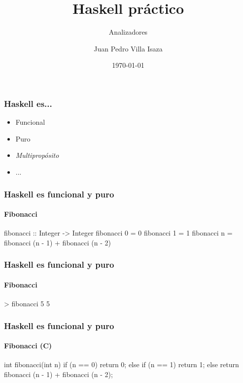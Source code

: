 \documentclass[spanish]{beamer}
\title{Haskell práctico}
\subtitle{Analizadores}
\author{Juan Pedro Villa Isaza}
\institute{Stack Builders}
\date{\today}
\begin{document}

\frame{\titlepage}


\begin{frame}
  \frametitle{Haskell es...}

  \begin{itemize}
  \item
    Funcional
  \item
    Puro
  \item
    \emph{Multipropósito}
  \item
    ...
  \end{itemize}
\end{frame}


\begin{frame}[fragile]
  \frametitle{Haskell es funcional y puro}
  \framesubtitle{Fibonacci}

  \begin{code}
fibonacci :: Integer -> Integer
fibonacci 0 = 0
fibonacci 1 = 1
fibonacci n = fibonacci (n - 1) + fibonacci (n - 2)
  \end{code}
\end{frame}


\begin{frame}[fragile]
  \frametitle{Haskell es funcional y puro}
  \framesubtitle{Fibonacci}

  \begin{code}
> fibonacci 5
5
  \end{code}
\end{frame}



\begin{frame}[fragile]
  \frametitle{Haskell es funcional y puro}
  \framesubtitle{Fibonacci (C)}

  \begin{code}
int fibonacci(int n) {
  if (n == 0)
    return 0;
  else if (n == 1)
    return 1;
  else
    return fibonacci (n - 1) + fibonacci (n - 2);
}
  \end{code}
\end{frame}
\end{document}
